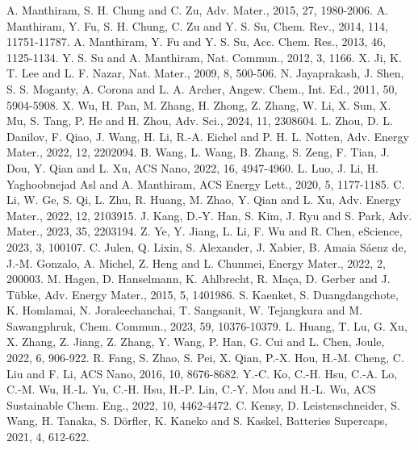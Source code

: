 \documentclass[12pt,a4paper,twocolumn]{article} %
\newcommand{\english}[1]{\textenglish{#1}}
\begin{document}
\begin{thebibliography}{99}
\setlength{\itemsep}{0pt} %

 \english{A. Manthiram, S. H. Chung and C. Zu, Adv. Mater., 2015, 27, 1980-2006.}
 \english{A. Manthiram, Y. Fu, S. H. Chung, C. Zu and Y. S. Su, Chem. Rev., 2014, 114, 11751-11787.}
 \english{A. Manthiram, Y. Fu and Y. S. Su, Acc. Chem. Res., 2013, 46, 1125-1134.}
 \english{Y. S. Su and A. Manthiram, Nat. Commun., 2012, 3, 1166.}
 \english{X. Ji, K. T. Lee and L. F. Nazar, Nat. Mater., 2009, 8, 500-506.}
 \english{N. Jayaprakash, J. Shen, S. S. Moganty, A. Corona and L. A. Archer, Angew. Chem., Int. Ed., 2011, 50, 5904-5908.}
 \english{X. Wu, H. Pan, M. Zhang, H. Zhong, Z. Zhang, W. Li, X. Sun, X. Mu, S. Tang, P. He and H. Zhou, Adv. Sci., 2024, 11, 2308604.}
 \english{L. Zhou, D. L. Danilov, F. Qiao, J. Wang, H. Li, R.-A. Eichel and P. H. L. Notten, Adv. Energy Mater., 2022, 12, 2202094.}
 \english{B. Wang, L. Wang, B. Zhang, S. Zeng, F. Tian, J. Dou, Y. Qian and L. Xu, ACS Nano, 2022, 16, 4947-4960.}
 \english{L. Luo, J. Li, H. Yaghoobnejad Asl and A. Manthiram, ACS Energy Lett., 2020, 5, 1177-1185.}
 \english{C. Li, W. Ge, S. Qi, L. Zhu, R. Huang, M. Zhao, Y. Qian and L. Xu, Adv. Energy Mater., 2022, 12, 2103915.}
 \english{J. Kang, D.-Y. Han, S. Kim, J. Ryu and S. Park, Adv. Mater., 2023, 35, 2203194.}
 \english{Z. Ye, Y. Jiang, L. Li, F. Wu and R. Chen, eScience, 2023, 3, 100107.}
 \english{C. Julen, Q. Lixin, S. Alexander, J. Xabier, B. Amaia Sáenz de, J.-M. Gonzalo, A. Michel, Z. Heng and L. Chunmei, Energy Mater., 2022, 2, 200003.}
 \english{M. Hagen, D. Hanselmann, K. Ahlbrecht, R. Maça, D. Gerber and J. Tübke, Adv. Energy Mater., 2015, 5, 1401986.}
 \english{S. Kaenket, S. Duangdangchote, K. Homlamai, N. Joraleechanchai, T. Sangsanit, W. Tejangkura and M. Sawangphruk, Chem. Commun., 2023, 59, 10376-10379.}
 \english{L. Huang, T. Lu, G. Xu, X. Zhang, Z. Jiang, Z. Zhang, Y. Wang, P. Han, G. Cui and L. Chen, Joule, 2022, 6, 906-922.}
 \english{R. Fang, S. Zhao, S. Pei, X. Qian, P.-X. Hou, H.-M. Cheng, C. Liu and F. Li, ACS Nano, 2016, 10, 8676-8682.}
 \english{Y.-C. Ko, C.-H. Hsu, C.-A. Lo, C.-M. Wu, H.-L. Yu, C.-H. Hsu, H.-P. Lin, C.-Y. Mou and H.-L. Wu, ACS Sustainable Chem. Eng., 2022, 10, 4462-4472.}
 \english{C. Kensy, D. Leistenschneider, S. Wang, H. Tanaka, S. Dörfler, K. Kaneko and S. Kaskel, Batteries Supercaps, 2021, 4, 612-622.}

\end{thebibliography}
\end{document}
